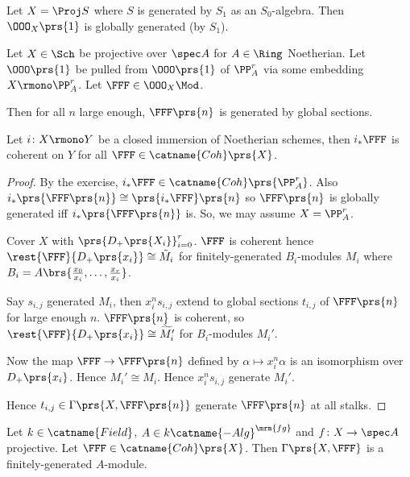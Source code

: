 \documentclass[10pt,a4paper,twoside,openany,hidelinks]{book}
\begin{document}
\begin{example}
Let $X = \Proj S$ where $S$ is generated by $S_1$ as an $S_0$-algebra. Then $\OOO_X\prs{1}$ is globally generated (by $S_1$).
\end{example}

\begin{theorem}[Serre]
Let $X \in \Sch$ be projective over $\spec A$ for $A \in \Ring$ Noetherian.
Let $\OOO\prs{1}$ be pulled from $\OOO\prs{1}$ of $\PP_A^r$ via some embedding $X \rmono \PP_A^r$.
Let $\FFF \in \OOO_X\Mod$.

Then for all $n$ large enough, $\FFF\prs{n}$ is generated by global sections.
\end{theorem}

\begin{exercise}
Let $i \colon X \rmono Y$ be a closed immersion of Noetherian schemes, then $i_*\FFF$ is coherent on $Y$ for all $\FFF \in \catname{Coh}\prs{X}$.
\end{exercise}


\begin{proof}
By the exercise, $i_* \FFF \in \catname{Coh}\prs{\PP_A^r}$. Also $i_*\prs{\FFF\prs{n}} \cong \prs{i_* \FFF}\prs{n}$ so $\FFF\prs{n}$ is globally generated iff $i_*\prs{\FFF\prs{n}}$ is.
So, we may assume $X = \PP_A^r$.

Cover $X$ with $\prs{D_+\prs{X_i}}_{i = 0}^{r}$. $\FFF$ is coherent hence $\rest{\FFF}{D_+\prs{x_i}} \cong \tilde{M}_i$ for finitely-generated $B_i$-modules $M_i$ where $B_i = A\brs{\frac{x_0}{x_i}, \ldots, \frac{x_r}{x_i}}$.

Say $s_{i,j}$ generated $M_i$, then $x_i^n s_{i,j}$ extend to global sections $t_{i,j}$ of $\FFF\prs{n}$ for large enough $n$. $\FFF\prs{n}$ is coherent, so $\rest{\FFF}{D_+\prs{x_i}} \cong \widetilde{M'_i}$ for $B_i$-modules $M_i'$.

Now the map $\FFF \to \FFF\prs{n}$ defined by $\alpha \mapsto x_i^n \alpha$ is an isomorphism over $D_+\prs{x_i}$. Hence $M_i' \cong M_i$.
Hence $x_i^{n} s_{i,j}$ generate $M_i'$.

Hence $t_{i,j} \in \Gamma\prs{X, \FFF\prs{n}}$ generate $\FFF\prs{n}$ at all stalks.
\end{proof}

\begin{theorem}
Let $k \in \catname{Field}$, $A \in k\catname{-Alg}^{\mrm{fg}}$ and $f \colon X \to \spec A$ projective. Let $\FFF \in \catname{Coh}\prs{X}$. Then $\Gamma\prs{X,\FFF}$ is a finitely-generated $A$-module.
\end{theorem}
\end{document}
